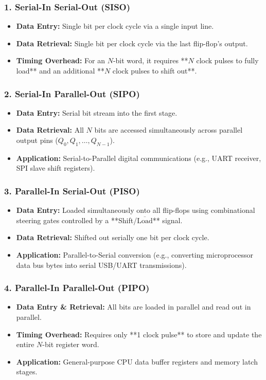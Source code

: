 \subsubsection{1. Serial-In Serial-Out (SISO)}
\begin{itemize}
    \item \textbf{Data Entry:} Single bit per clock cycle via a single input line.
    \item \textbf{Data Retrieval:} Single bit per clock cycle via the last flip-flop's output.
    \item \textbf{Timing Overhead:} For an $N$-bit word, it requires **$N$ clock pulses to fully load** and an additional **$N$ clock pulses to shift out**.
\end{itemize}

\subsubsection{2. Serial-In Parallel-Out (SIPO)}
\begin{itemize}
    \item \textbf{Data Entry:} Serial bit stream into the first stage.
    \item \textbf{Data Retrieval:} All $N$ bits are accessed simultaneously across parallel output pins ($Q_0, Q_1, \dots, Q_{N-1}$).
    \item \textbf{Application:} Serial-to-Parallel digital communications (e.g., UART receiver, SPI slave shift registers).
\end{itemize}

\subsubsection{3. Parallel-In Serial-Out (PISO)}
\begin{itemize}
    \item \textbf{Data Entry:} Loaded simultaneously onto all flip-flops using combinational steering gates controlled by a **Shift/$\overline{\text{Load}}$** signal.
    \item \textbf{Data Retrieval:} Shifted out serially one bit per clock cycle.
    \item \textbf{Application:} Parallel-to-Serial conversion (e.g., converting microprocessor data bus bytes into serial USB/UART transmissions).
\end{itemize}

\subsubsection{4. Parallel-In Parallel-Out (PIPO)}
\begin{itemize}
    \item \textbf{Data Entry \& Retrieval:} All bits are loaded in parallel and read out in parallel.
    \item \textbf{Timing Overhead:} Requires only **1 clock pulse** to store and update the entire $N$-bit register word.
    \item \textbf{Application:} General-purpose CPU data buffer registers and memory latch stages.
\end{itemize}

